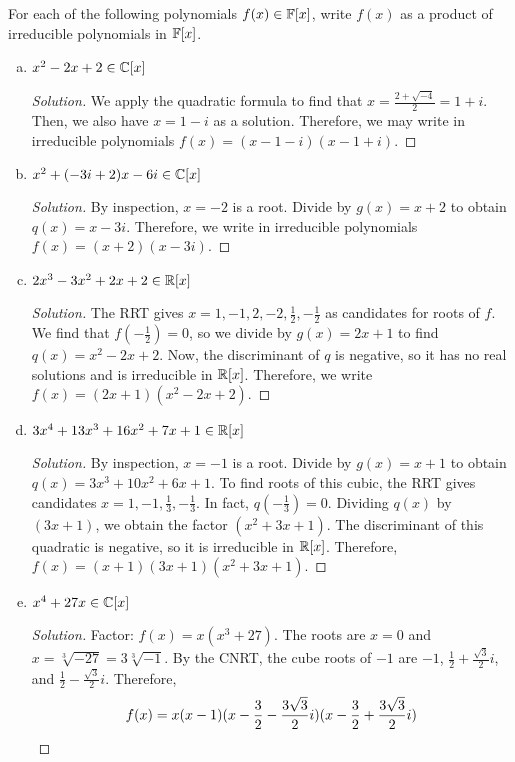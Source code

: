 \question For each of the following polynomials $f(x) \in \mathbb{F}[x]$,
write $f(x)$ as a product of irreducible polynomials in $\mathbb{F}[x]$.
\begin{enumerate}[(a)]
  \item $x^2 - 2x + 2 \in \mathbb{C}[x]$
        \begin{proof}[Solution]
          We apply the quadratic formula to find that $x = \frac{2+\sqrt{-4}}{2} = 1+i$.
          Then, we also have $x = 1-i$ as a solution.
          Therefore, we may write in irreducible polynomials $f(x)=(x-1-i)(x-1+i)$.
        \end{proof}
  \item $x^2 + (-3i + 2)x - 6i \in \mathbb{C}[x]$
        \begin{proof}[Solution]
          By inspection, $x=-2$ is a root.
          Divide by $g(x)=x+2$ to obtain $q(x)=x-3i$.
          Therefore, we write in irreducible polynomials $f(x)=(x+2)(x-3i)$.
        \end{proof}
  \item $2x^3 - 3x^2 + 2x + 2 \in \mathbb{R}[x]$
        \begin{proof}[Solution]
          The RRT gives $x=1,-1,2,-2,\frac12,-\frac12$ as candidates for roots of $f$.
          We find that $f(-\frac12)=0$, so we divide by $g(x)=2x+1$ to find $q(x)=x^2-2x+2$.
          Now, the discriminant of $q$ is negative, so it has no real solutions and is irreducible in $\mathbb{R}[x]$.
          Therefore, we write $f(x)=(2x+1)(x^2-2x+2)$.
        \end{proof}
  \item $3x^4 + 13x^3 + 16x^2 + 7x + 1 \in \mathbb{R}[x]$
        \begin{proof}[Solution]
          By inspection, $x=-1$ is a root.
          Divide by $g(x)=x+1$ to obtain $q(x)=3x^3+10x^2+6x+1$.
          To find roots of this cubic, the RRT gives candidates $x=1,-1,\frac13,-\frac13$.
          In fact, $q(-\frac13)=0$.
          Dividing $q(x)$ by $(3x+1)$, we obtain the factor $(x^2+3x+1)$.
          The discriminant of this quadratic is negative, so it is irreducible in $\mathbb{R}[x]$.
          Therefore, $f(x) = (x+1)(3x+1)(x^2+3x+1)$.
        \end{proof}
  \item $x^4 + 27x \in \mathbb{C}[x]$
        \begin{proof}[Solution]
          Factor: $f(x) = x(x^3 + 27)$.
          The roots are $x=0$ and $x=\sqrt[3]{-27}=3\sqrt[3]{-1}$.
          By the CNRT, the cube roots of $-1$ are $-1$,
          $\frac12+\frac{\sqrt{3}}2i$, and $\frac12-\frac{\sqrt{3}}2i$. Therefore,
          \[ f(x) = x(x-1)(x-\frac{3}{2}-\frac{3\sqrt{3}}{2}i)(x-\frac{3}{2}+\frac{3\sqrt{3}}{2}i) \qedhere \]
        \end{proof}
\end{enumerate}


